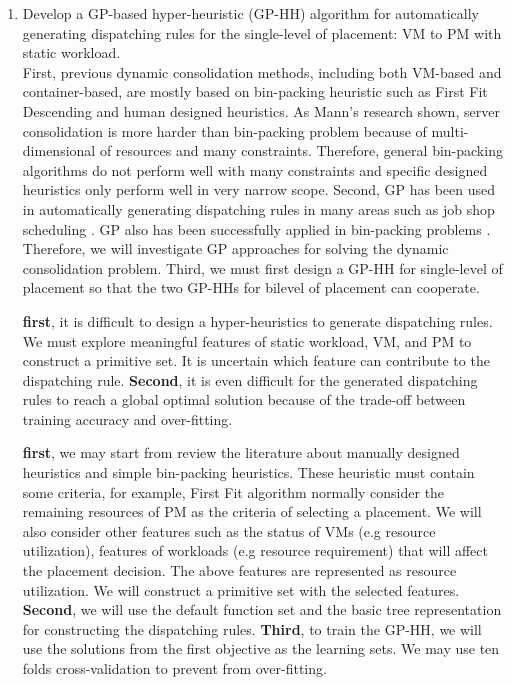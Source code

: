 \begin{enumerate}

	\item Develop a GP-based hyper-heuristic (GP-HH) algorithm for automatically generating dispatching rules for the single-level of placement:  VM to PM with static workload. \\

	 First, previous dynamic consolidation methods, including both VM-based and container-based, are mostly based on bin-packing heuristic such as First Fit Descending and human designed heuristics. As Mann's research \cite{Mann:2015ua} shown, server consolidation is more harder than bin-packing problem because of multi-dimensional of resources and many constraints. Therefore, general bin-packing algorithms do not perform well with many constraints and specific designed heuristics only perform well in very narrow scope. Second, GP has been used in automatically generating dispatching rules in many areas such as job shop scheduling \cite{Nguyen:2014eu}. GP also has been successfully applied in bin-packing problems \cite{Burke:2006ei}. Therefore, we will investigate GP approaches for solving the dynamic consolidation problem. Third, we must first design a GP-HH for single-level of placement so that the two GP-HHs for bilevel of placement can cooperate.

	 \textbf{first}, it is difficult to design a hyper-heuristics to generate dispatching rules. We must explore meaningful features of static workload, VM, and PM to construct a primitive set. It is uncertain which feature can contribute to the dispatching rule.  \textbf{Second}, it is even difficult for the generated dispatching rules to reach a global optimal solution because of the trade-off between training accuracy and over-fitting.

	 \textbf{first}, we may start from review the literature about manually designed heuristics and simple bin-packing heuristics. These heuristic must contain some criteria, for example, First Fit algorithm normally consider the remaining resources of PM as the criteria of selecting a placement. We will also consider other features such as the status of VMs (e.g resource utilization), features of workloads (e.g resource requirement) that will affect the placement decision. The above features are represented as resource utilization. We will construct a primitive set with the selected features. 
	\textbf{Second}, we will use the default function set and the basic tree representation for constructing the dispatching rules. 
	\textbf{Third}, to train the GP-HH, we will use the solutions from the first objective as the learning sets. We may use ten folds cross-validation to prevent from over-fitting. 


\end{enumerate}
